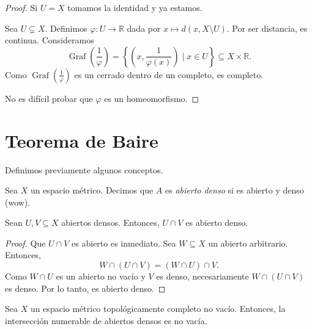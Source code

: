 \begin{proof}
	Si $U = X$ tomamos la identidad y ya estamos.

	Sea $U \subsetneq X$. Definimos $\varphi : U \to \mathbb{R}$ dada por $x \mapsto d(x, X \setminus U)$. Por ser distancia, es continua. Consideramos
	\begin{equation*}
		\operatorname{Graf}\left(\frac{1}{\varphi}\right) = \left\{ (x, \frac{1}{\varphi (x)}) \mid x \in U \right\} \subseteq X \times \mathbb{R}.
	\end{equation*}
	Como $\operatorname{Graf}(\frac{1}{\varphi})$ es un cerrado dentro de un completo, es completo.

	No es difícil probar que $\varphi$ es un homeomorfismo.\end{proof}


\section{Teorema de Baire}

Definimos previamente algunos conceptos.

\begin{definition}
	Sea $X$ un espacio métrico. Decimos que $A$ es \emph{abierto denso} si es abierto y denso (wow).
\end{definition}

\begin{lemma}
	Sean $U, V \subseteq X$ abiertos densos. Entonces, $U \cap V$ es abierto denso.
\end{lemma}

\begin{proof}
	Que $U \cap V$ es abierto es inmediato. Sea $W \subseteq X$ un abierto arbitrario. Entonces,
	\begin{equation*}
		W \cap (U \cap V) = (W \cap U) \cap V.
	\end{equation*}
	Como $W \cap U$ es un abierto no vacío y $V$ es denso, necesariamente $W \cap (U \cap V)$ es denso. Por lo tanto, es abierto denso.
\end{proof}

\begin{proposition}
	Sea $X$ un espacio métrico topológicamente completo no vacío. Entonces, la intersección numerable de abiertos densos es no vacía.
\end{proposition}

